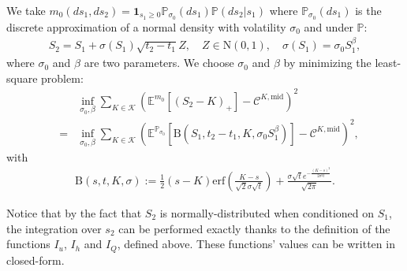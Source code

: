 \documentclass{amsart}%
\def\Cc{{\cal C}}
\def\no{\noindent}
\theoremstyle{definition}
\theoremstyle{remark}
\newcommand{\PP}{\mathbb{P}}
\newcommand{\beaa}{\begin{eqnarray*}}
\newcommand{\eeaa}{\end{eqnarray*}}
\newcommand{\EE}{{\mathbb E}}
\newcommand{\cal}{\mathcal}
\begin{document}
\no We take ${m_0}(ds_1,ds_2)=\mathbf{1}_{s_1\ge 0}\PP_{\sigma_0 }(ds_1) \PP(ds_2 |s_1)$ where $\PP_{\sigma_0 }(ds_1)$ is the discrete approximation of a normal density with volatility $\sigma_0$ and under $\PP$:
\beaa
S_2=S_1+ \sigma(S_1)\sqrt{t_2-t_1} Z, \quad Z \in \mathrm{N}(0,1), \quad
\sigma(S_1)=\sigma_0 S_1^{\beta},
\eeaa
where $\sigma_0$ and $\beta$ are two parameters. We choose $\sigma_0$ and $\beta$ by minimizing  the least-square problem:
\beaa
&&\inf_{\sigma_0,\beta} \sum_{K \in {\cal K}} \left(\EE^{{m_0}}[ (S_2-K)_+]-\Cc^{K,\mathrm{mid}} \right)^2 \\
&=&\inf_{\sigma_0,\beta} \sum_{K \in {\cal K}} \left( \EE^{\PP_{\sigma_0 }}[\mathrm{B}(S_1,t_2-t_1,K,\sigma_0 S_1^{\beta})]-\Cc^{K,\mathrm{mid}} \right)^2,
\eeaa
with
\beaa
\mathrm{B}(s,t,K,\sigma):=\frac{1}{2} (s-K) \text{erf}\left(\frac{K-s}{\sqrt{2} \sigma  \sqrt{t}}\right)+\frac{\sigma
   \sqrt{t} e^{-\frac{(K-s)^2}{2 \sigma ^2 t}}}{\sqrt{2 \pi }}.
   \eeaa


\no Notice that by the fact that $S_2$ is normally-distributed when conditioned on $S_1$, the integration over $s_2$ can be performed exactly thanks to the definition of the functions $I_u$, $I_h$ and $I_Q$, defined above. These functions' values can be written in closed-form.
\end{document}
